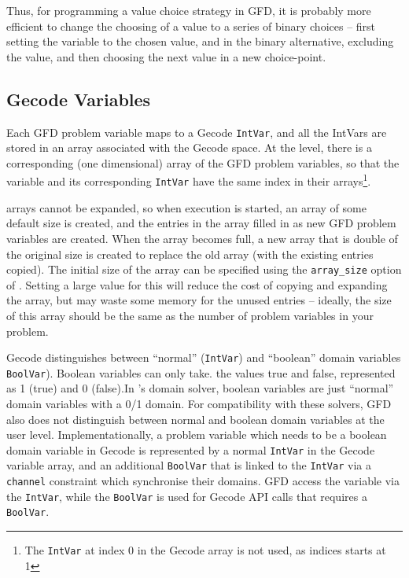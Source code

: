 Thus, for programming a value choice strategy in GFD, it is probably
 more efficient to change the choosing of a value to a series of binary
 choices -- first setting the variable to the chosen value, and in the
binary alternative, excluding the value, and then choosing the next
 value in a new choice-point.

\subsection{Gecode Variables}

Each GFD problem variable maps to a Gecode {\tt IntVar}, and all the IntVars
are stored in an array associated with the Gecode space.
At the \eclipse level, there is a corresponding (one dimensional)
array of the GFD problem
variables, so that the \eclipse variable and its corresponding {\tt IntVar}
have the same index in their 
arrays\footnote{The {\tt IntVar} at index 0 in the Gecode array is not used, as \eclipse indices starts at 1}. 

\eclipse arrays cannot be expanded, so when execution is started, an
array of some default size is created, and the entries in the array
filled in as new GFD problem variables are created. When the array
 becomes full, a new array that is double of the original size is
 created to replace the old array (with the existing entries copied).
The initial size of the array can be specified using the 
{\tt array_size} option of . Setting a large
 value for this will reduce the cost of copying and expanding the array, 
but may waste some memory for the unused entries -- ideally, the size of
this array should be the same as the number of problem variables in your
problem.

Gecode distinguishes between ``normal'' ({\tt IntVar})
and ``boolean'' domain variables {\tt BoolVar}). Boolean variables can only take. 
the values true and false, represented as 1 (true) and 0
 (false).In \eclipse's domain solver, boolean variables are just ``normal''
domain variables with a 0/1 domain. For compatibility with these
 solvers, GFD also does not distinguish between normal and boolean
 domain variables at the user level. Implementationally, a problem variable
 which needs to be a boolean domain variable in Gecode is represented by
a normal {\tt IntVar} in the Gecode variable array, and an additional
 {\tt BoolVar} that is linked to the {\tt IntVar} via a {\tt channel}
constraint which synchronise their domains. GFD access the variable
 via the {\tt IntVar}, while the {\tt BoolVar} is used for Gecode API calls
that requires a {\tt BoolVar}.

